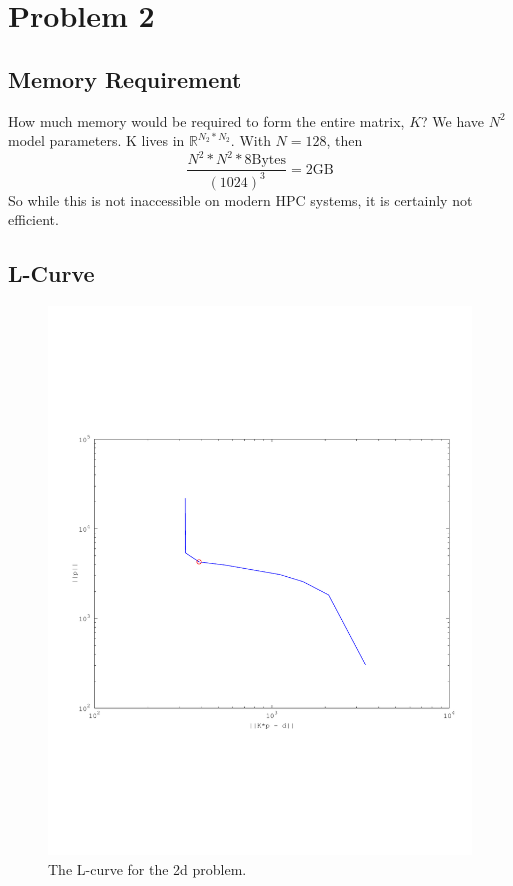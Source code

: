 \documentclass{article}
\begin{document}
\newpage
\section{Problem 2}



\subsection{Memory Requirement}

How much memory would be required to form the entire matrix, $K$?
We have $N^2$ model parameters. K lives in $\mathbb{R}^{N_2 * N_2}$. 
With $N=128$, then 
\begin{equation}
\frac{N^2 * N^2 * 8 \text{Bytes}}{(1024)^3} = 2 \text{GB}
\end{equation}
So while this is not inaccessible on modern HPC systems, it is certainly
not efficient.  

\subsection{L-Curve}

\begin{figure}[!htb]
  \includegraphics[scale=.5]{plots/L-curve2d.pdf}
  \caption{The L-curve for the 2d problem.} 
  \label{fig:l2d}
\end{figure}
\end{document}
